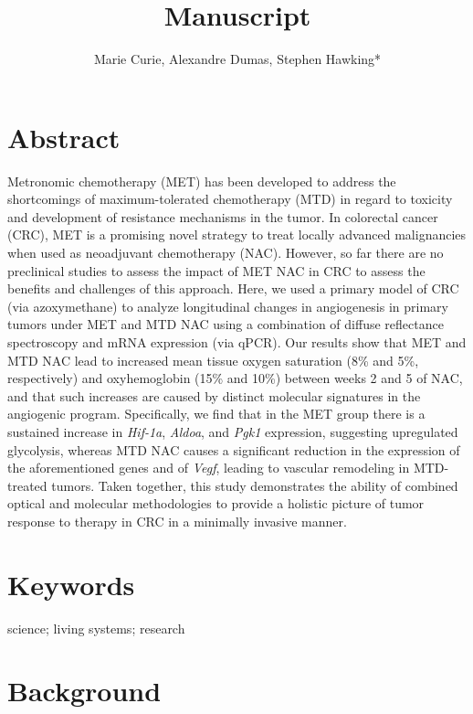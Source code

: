 \documentclass[
]{article}
\author{Marie Curie, Alexandre Dumas, Stephen Hawking*}
\affil{Department of Science, University of Space}
\affil{\normalfont {hawking@space.edu}}
\title{Manuscript}
\date{\vspace{-2.5em}}
\begin{document}
\maketitle

\hypertarget{abstract}{%
\section{Abstract}\label{abstract}}

Metronomic chemotherapy (MET) has been developed to address the shortcomings of maximum-tolerated chemotherapy (MTD) in regard to toxicity and development of resistance mechanisms in the tumor. In colorectal cancer (CRC), MET is a promising novel strategy to treat locally advanced malignancies when used as neoadjuvant chemotherapy (NAC). However, so far there are no preclinical studies to assess the impact of MET NAC in CRC to assess the benefits and challenges of this approach. Here, we used a primary model of CRC (via azoxymethane) to analyze longitudinal changes in angiogenesis in primary tumors under MET and MTD NAC using a combination of diffuse reflectance spectroscopy and mRNA expression (via qPCR). Our results show that MET and MTD NAC lead to increased mean tissue oxygen saturation (8\% and 5\%, respectively) and oxyhemoglobin (15\% and 10\%) between weeks 2 and 5 of NAC, and that such increases are caused by distinct molecular signatures in the angiogenic program. Specifically, we find that in the MET group there is a sustained increase in \emph{Hif-1a}, \emph{Aldoa}, and \emph{Pgk1} expression, suggesting upregulated glycolysis, whereas MTD NAC causes a significant reduction in the expression of the aforementioned genes and of \emph{Vegf}, leading to vascular remodeling in MTD-treated tumors. Taken together, this study demonstrates the ability of combined optical and molecular methodologies to provide a holistic picture of tumor response to therapy in CRC in a minimally invasive manner.

\hypertarget{keywords}{%
\section*{Keywords}\label{keywords}}

science; living systems; research

\hypertarget{background}{%
\section{Background}\label{background}}
\end{document}

